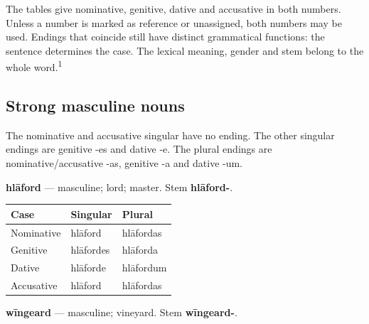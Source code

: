 The tables give nominative, genitive, dative and accusative in both numbers. Unless a number is marked as reference or unassigned, both numbers may be used. Endings that coincide still have distinct grammatical functions: the sentence determines the case. The lexical meaning, gender and stem belong to the whole word.\textsuperscript{1}

\subsection*{Strong masculine nouns}

The nominative and accusative singular have no ending. The other singular endings are genitive -es and dative -e. The plural endings are nominative/\allowbreak{}accusative -as, genitive -a and dative -um.

\textbf{hlāford} — masculine; lord; master. Stem \textbf{hlāford-}.

\par\begingroup
\fontsize{10.5}{13.2}\selectfont
\setlength{\LTleft}{0pt}\setlength{\LTright}{\fill}
\noindent
\begin{tabular}{@{}>{\raggedright\arraybackslash}p{39.46mm}>{\raggedright\arraybackslash}p{39.46mm}>{\raggedright\arraybackslash}p{39.46mm}@{}}
\toprule
\textbf{Case} & \textbf{Singular} & \textbf{Plural} \\
\midrule
Nominative & hlāford & hlāfordas \\
Genitive & hlāfordes & hlāforda \\
Dative & hlāforde & hlāfordum \\
Accusative & hlāford & hlāfordas \\
\bottomrule
\end{tabular}
\par\endgroup

\textbf{wīngeard} — masculine; vineyard. Stem \textbf{wīngeard-}.

